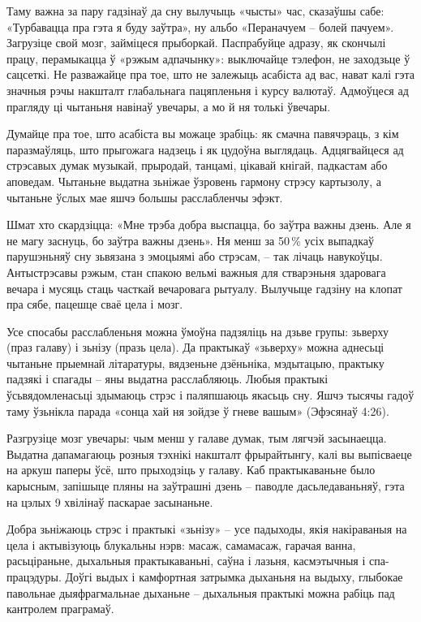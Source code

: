 Таму важна за пару гадзінаў да сну вылучыць «чысты» час, сказаўшы сабе: «Турбавацца пра гэта я буду заўтра», ну альбо «Пераначуем – болей пачуем». Загрузіце свой мозг, займіцеся прыборкай. Паспрабуйце адразу, як скончылі працу, перамыкацца ў «рэжым адпачынку»: выключайце тэлефон, не заходзьце ў сацсеткі. Не разважайце пра тое, што не залежыць асабіста ад вас, нават калі гэта значныя рэчы накшталт глабальнага пацяпленьня і курсу валютаў. Адмоўцеся ад прагляду ці чытаньня навінаў увечары, а мо й ня толькі ўвечары.

Думайце пра тое, што асабіста вы можаце зрабіць: як смачна павячэраць, з кім паразмаўляць, што прыгожага надзець і як цудоўна выглядаць. Адцягвайцеся ад стрэсавых думак музыкай, прыродай, танцамі, цікавай кнігай, падкастам або аповедам. Чытаньне выдатна зьніжае ўзровень гармону стрэсу картызолу, а чытаньне ўслых мае яшчэ большы расслабленчы эфэкт.

Шмат хто скардзіцца: «Мне трэба добра выспацца, бо заўтра важны дзень. Але я не магу заснуць, бо заўтра важны дзень». Ня менш за 50\,\% усіх выпадкаў парушэньняў сну зьвязана з эмоцыямі або стрэсам, – так лічаць навукоўцы. Антыстрэсавы рэжым, стан спакою вельмі важныя для стварэньня здаровага вечара і мусяць стаць часткай вечаровага рытуалу. Вылучыце гадзіну на клопат пра сябе, пацешце сваё цела і мозг.

Усе спосабы расслабленьня можна ўмоўна падзяліць на дзьве групы: зьверху (праз галаву) і зьнізу (празь цела). Да практыкаў «зьверху» можна аднесьці чытаньне прыемнай літаратуры, вядзеньне дзёньніка, мэдытацыю, практыку падзякі і спагады – яны выдатна расслабляюць. Любыя практыкі ўсьвядомленасьці здымаюць стрэс і паляпшаюць якасьць сну. Яшчэ тысячы гадоў таму ўзьнікла парада «сонца хай ня зойдзе ў гневе вашым» (Эфэсянаў 4:26).

Разгрузіце мозг увечары: чым менш у галаве думак, тым лягчэй засынаецца. Выдатна дапамагаюць розныя тэхнікі накшталт фрырайтынгу, калі вы выпісваеце на аркуш паперы ўсё, што прыходзіць у галаву. Каб практыкаваньне было карысным, запішыце пляны на заўтрашні дзень – паводле дасьледаваньняў, гэта на цэлых 9 хвілінаў паскарае засынаньне.

Добра зьніжаюць стрэс і практыкі «зьнізу» – усе падыходы, якія накіраваныя на цела і актывізуюць блукальны нэрв: масаж, самамасаж, гарачая ванна, расьціраньне, дыхальныя практыкаваньні, саўна і лазьня, касмэтычныя і спа-працэдуры. Доўгі выдых і камфортная затрымка дыханьня на выдыху, глыбокае павольнае дыяфрагмальнае дыханьне – дыхальныя практыкі можна рабіць пад кантролем праграмаў.

